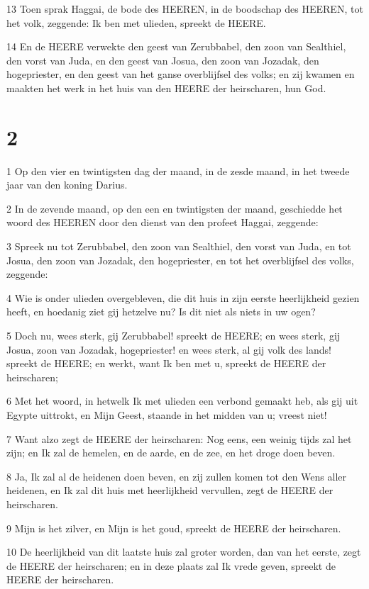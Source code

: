 \par 13 Toen sprak Haggai, de bode des HEEREN, in de boodschap des HEEREN, tot het volk, zeggende: Ik ben met ulieden, spreekt de HEERE.
\par 14 En de HEERE verwekte den geest van Zerubbabel, den zoon van Sealthiel, den vorst van Juda, en den geest van Josua, den zoon van Jozadak, den hogepriester, en den geest van het ganse overblijfsel des volks; en zij kwamen en maakten het werk in het huis van den HEERE der heirscharen, hun God.

\chapter{2}

\par 1 Op den vier en twintigsten dag der maand, in de zesde maand, in het tweede jaar van den koning Darius.
\par 2 In de zevende maand, op den een en twintigsten der maand, geschiedde het woord des HEEREN door den dienst van den profeet Haggai, zeggende:
\par 3 Spreek nu tot Zerubbabel, den zoon van Sealthiel, den vorst van Juda, en tot Josua, den zoon van Jozadak, den hogepriester, en tot het overblijfsel des volks, zeggende:
\par 4 Wie is onder ulieden overgebleven, die dit huis in zijn eerste heerlijkheid gezien heeft, en hoedanig ziet gij hetzelve nu? Is dit niet als niets in uw ogen?
\par 5 Doch nu, wees sterk, gij Zerubbabel! spreekt de HEERE; en wees sterk, gij Josua, zoon van Jozadak, hogepriester! en wees sterk, al gij volk des lands! spreekt de HEERE; en werkt, want Ik ben met u, spreekt de HEERE der heirscharen;
\par 6 Met het woord, in hetwelk Ik met ulieden een verbond gemaakt heb, als gij uit Egypte uittrokt, en Mijn Geest, staande in het midden van u; vreest niet!
\par 7 Want alzo zegt de HEERE der heirscharen: Nog eens, een weinig tijds zal het zijn; en Ik zal de hemelen, en de aarde, en de zee, en het droge doen beven.
\par 8 Ja, Ik zal al de heidenen doen beven, en zij zullen komen tot den Wens aller heidenen, en Ik zal dit huis met heerlijkheid vervullen, zegt de HEERE der heirscharen.
\par 9 Mijn is het zilver, en Mijn is het goud, spreekt de HEERE der heirscharen.
\par 10 De heerlijkheid van dit laatste huis zal groter worden, dan van het eerste, zegt de HEERE der heirscharen; en in deze plaats zal Ik vrede geven, spreekt de HEERE der heirscharen.
